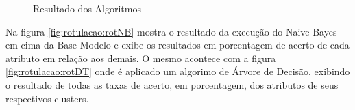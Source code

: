 \begin{figure}[h!]
    \centering
    \quad
    
    \caption{Resultado dos Algoritmos} \label{fig:rotulacao}
\end{figure}

Na figura \ref{fig:rotulacao:rotNB} mostra o resultado da execução do Naive Bayes em cima da Base Modelo e exibe os resultados em porcentagem de acerto de cada atributo em relação aos demais. O mesmo acontece com a figura \ref{fig:rotulacao:rotDT} onde é aplicado um algorimo de Árvore de Decisão, exibindo o resultado de todas as taxas de acerto, em porcentagem, dos atributos de seus respectivos clusters.

